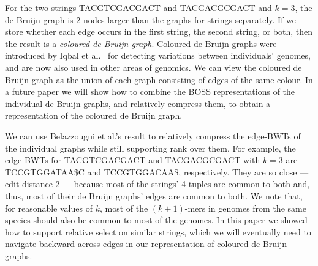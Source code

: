 For the two strings {\sf TACGTCGACGACT} and {\sf TACGACGCGACT} and \(k = 3\), the de Bruijn graph is 2 nodes larger than the graphs for strings separately.  If we store whether each edge occurs in the first string, the second string, or both, then the result is a {\em coloured de Bruijn graph}.  Coloured de Bruijn graphs were introduced by Iqbal et al.~\cite{ICTFM12} for detecting variations between individuals' genomes, and are now also used in other areas of genomics.  We can view the coloured de Bruijn graph as the union of each graph consisting of edges of the same colour.  In a future paper we will show how to combine the BOSS representations of the individual de Bruijn graphs, and relatively compress them, to obtain a representation of the coloured de Bruijn graph.

We can use Belazzougui et al.'s result to relatively compress the edge-BWTs of the individual graphs while still supporting rank over them.  For example, the edge-BWTs for {\sf TACGTCGACGACT} and {\sf TACGACGCGACT} with \(k = 3\) are {\sf TCCGTGGATAA\$C} and {\sf TCCGTGGACAA\$}, respectively.  They are so close --- edit distance 2 --- because most of the strings' 4-tuples are common to both and, thus, most of their de Bruijn graphs' edges are common to both.  We note that, for reasonable values of $k$, most of the \((k + 1)\)-mers in genomes from the same species should also be common to most of the genomes.  In this paper we showed how to support relative select on similar strings, which we will eventually need to navigate backward across edges in our representation of coloured de Bruijn graphs.

